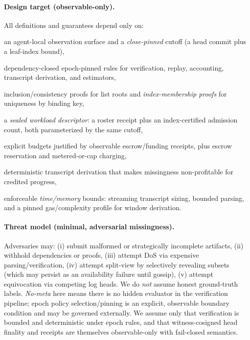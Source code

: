 \documentclass[11pt]{article}
\newcommand{\term}[1]{\emph{#1}}
\newcommand{\1}{\mathbf{1}}
\theoremstyle{definition}
\theoremstyle{plain}
\begin{document}
\paragraph{Design target (observable-only).}
All definitions and guarantees depend only on:
\begin{tightitemize}
\item an agent-local observation surface and a \emph{close-pinned} cutoff (a head commit plus a leaf-index bound),
\item dependency-closed epoch-pinned rules for verification, replay, accounting, transcript derivation, and estimators,
\item inclusion/consistency proofs for list roots and \emph{index-membership proofs} for uniqueness by binding key,
\item a \emph{sealed workload descriptor}: a roster receipt plus an index-certified admission count, both parameterized by the same cutoff,
\item explicit budgets justified by observable escrow/funding receipts, plus escrow reservation and metered-or-cap charging,
\item deterministic transcript derivation that makes missingness non-profitable for credited progress,
\item enforceable \emph{time/memory} bounds: streaming transcript sizing, bounded parsing, and a pinned gas/complexity profile for window derivation.
\end{tightitemize}

\paragraph{Threat model (minimal, adversarial missingness).}
Adversaries may: (i) submit malformed or strategically incomplete artifacts, (ii) withhold dependencies or proofs, (iii) attempt DoS via expensive parsing/verification, (iv) attempt split-view by selectively revealing subsets (which may persist as an availability failure until gossip), (v) attempt equivocation via competing log heads. We do \emph{not} assume honest ground-truth labels. \term{No-meta} here means there is no hidden evaluator in the verification pipeline; epoch policy selection/pinning is an explicit, observable boundary condition and may be governed externally. We assume only that verification is bounded and deterministic under epoch rules, and that witness-cosigned head finality and receipts are themselves observable-only with fail-closed semantics.
\end{document}
